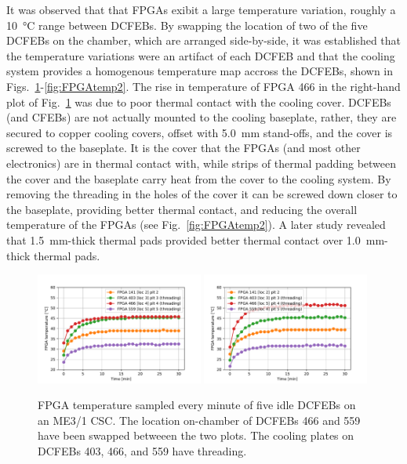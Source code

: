 It was observed that that FPGAs exibit a large temperature variation, roughly a \SI{10}{\celsius} range between DCFEBs. By swapping the location of two of the five DCFEBs on the chamber, which are arranged side-by-side, it was established that the temperature variations were an artifact of each DCFEB and that the cooling system provides a homogenous temperature map accross the DCFEBs, shown in Figs.~\ref{fig:FPGAtemp1}-\ref{fig:FPGAtemp2}. The rise in temperature of FPGA 466 in the right-hand plot of Fig.~\ref{fig:FPGAtemp1} was due to poor thermal contact with the cooling cover. DCFEBs (and CFEBs) are not actually mounted to the cooling baseplate, rather, they are secured to copper cooling covers, offset with \SI{5.0}{mm} stand-offs, and the cover is screwed to the baseplate. It is the cover that the FPGAs (and most other electronics) are in thermal contact with, while strips of thermal padding between the cover and the baseplate carry heat from the cover to the cooling system. By removing the threading in the holes of the cover it can be screwed down closer to the baseplate, providing better thermal contact, and reducing the overall temperature of the FPGAs (see Fig.~\ref{fig:FPGAtemp2}). A later study revealed that \SI{1.5}{mm}-thick thermal pads provided better thermal contact over \SI{1.0}{mm}-thick thermal pads.

\begin{figure}[H]
    \centering
    {\includegraphics[width=0.49\textwidth]{Images/Phase2Upgrades/DCFEBTempStudy/TempPlot_2019_01_14_plot1-5295.pdf}}
    {\includegraphics[width=0.49\textwidth]{Images/Phase2Upgrades/DCFEBTempStudy/TempPlot_2019_01_14_plot2-5296.pdf}}
    \caption{FPGA temperature sampled every minute of five idle DCFEBs on an ME3/1 CSC. The location on-chamber of DCFEBs 466 and 559 have been swapped betweeen the two plots. The cooling plates on DCFEBs 403, 466, and 559 have threading.}
    \label{fig:FPGAtemp1}
\end{figure}

